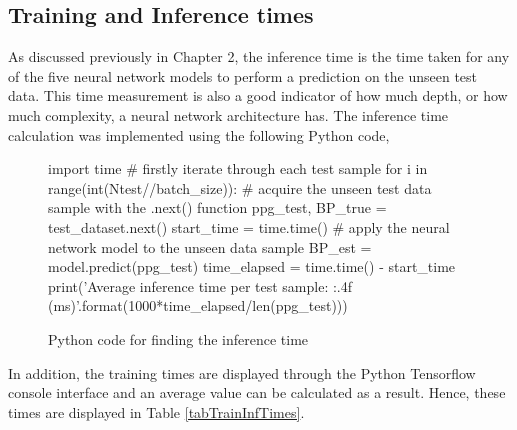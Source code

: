\subsection{Training and Inference times}
As discussed previously in Chapter 2, the inference time is the time taken for any of the five 
neural network models to perform a prediction on the unseen test data. This time measurement 
is also a good indicator of how much depth, or how much complexity, a neural network architecture has. 
The inference time calculation was implemented using the following Python code,
\begin{figure}[H]
    \begin{python}
    import time
    # firstly iterate through each test sample
    for i in range(int(Ntest//batch_size)):
        # acquire the unseen test data sample with the .next() function
        ppg_test, BP_true = test_dataset.next()
        start_time = time.time()
        # apply the neural network model to the unseen data sample
        BP_est = model.predict(ppg_test)
        time_elapsed = time.time() - start_time
        print('Average inference time per test sample: {:.4f} (ms)'.format(1000*time_elapsed/len(ppg_test)))
\end{python}
\caption{Python code for finding the inference time}
\end{figure}\noindent In addition, the training times are displayed through the Python Tensorflow console interface and an average value can be calculated as a result. 
Hence, these times are displayed in Table \ref{tabTrainInfTimes}.
\begin{table}[H]
    \centering
    \caption{Average Training Times and Inference Times for the five neural network architectures (average after running each configuration 3 times)}
    \label{tabTrainInfTimes}
    \end{table}